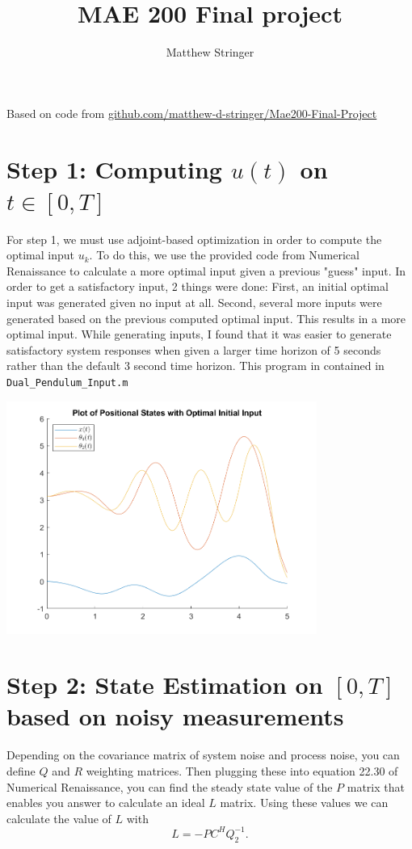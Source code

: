 \documentclass{article}
\title{MAE 200 Final project}
\author{Matthew Stringer}
\date{}
\theoremstyle{definition}
\begin{document}
    \maketitle
    \noindent Based on code from 
    \href{https://github.com/matthew-d-stringer/Mae200-Final-Project}{github.com/matthew-d-stringer/Mae200-Final-Project}

    \section*{Step 1: Computing $u(t)$ on $t \in [0,T]$}
    For step 1, we must use adjoint-based optimization in order to compute
    the optimal input $u_k$. To do this, we use the provided code from 
    Numerical Renaissance to calculate a more optimal input given a previous
    "guess" input. In order to get a satisfactory input, 2 things were done:
    First, an initial optimal input was generated given no input at all.
    Second, several more inputs were generated based on the previous computed
    optimal input.
    This results in a more optimal input.
    While generating inputs, I found that it was easier to generate satisfactory
    system responses when given a larger time horizon of 5 seconds rather than
    the default 3 second time horizon.
    This program in contained in \texttt{Dual\_Pendulum\_Input.m}
    \begin{center}
        \includegraphics*[width=4in]{Matlab Code/Step1_final_plot.png}
    \end{center}

    \section*{Step 2: State Estimation on $[0,T]$ based on noisy measurements}
    Depending on the covariance matrix of system noise and process noise, you can
    define $Q$ and $R$ weighting matrices. Then plugging these into equation 22.30
    of Numerical Renaissance, you can find the steady state value of the $P$ 
    matrix that enables you answer to calculate an ideal $L$ matrix. Using these
    values we can calculate the value of $L$ with
    \begin{equation*}
        L = -PC^H Q_2^{-1}.
    \end{equation*} 
    
\end{document}
